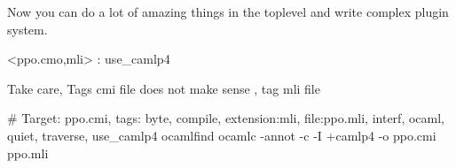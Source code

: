 Now you can do a lot of amazing things in the toplevel and write
complex plugin system.


\begin{bluetext}
<ppo.{cmo,mli}> : use_camlp4
\end{bluetext}

Take care, Tags cmi file does not make sense , tag mli file


\begin{bluetext}
# Target: ppo.cmi, tags: { byte, compile, extension:mli, file:ppo.mli, interf, ocaml, quiet, traverse, use_camlp4 }
ocamlfind ocamlc -annot -c -I +camlp4 -o ppo.cmi ppo.mli
\end{bluetext}


